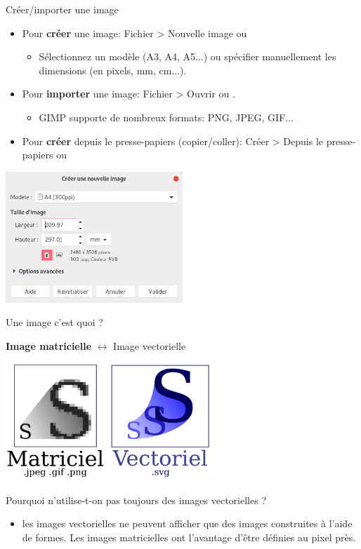 \documentclass[10pt,svgnames,usenames,table]{beamer}
\begin{document}
\begin{frame}{Créer/importer une image}
	\begin{itemize}
		\item Pour \textbf{créer} une image: Fichier > Nouvelle image ou 
			\begin{itemize}
				\item Sélectionnez un modèle (A3, A4, A5...) ou spécifier manuellement les dimensions (en pixels, mm, cm...).
			\end{itemize}
		\item Pour \textbf{importer} une image: Fichier  > Ouvrir ou .
			\begin{itemize}
				\item GIMP supporte de nombreux formats: PNG, JPEG, GIF...
			\end{itemize}
		\item Pour \textbf{créer} depuis le presse-papiers (copier/coller): Créer > Depuis le presse-papiers ou 
	\end{itemize}
	\begin{center}
		\includegraphics[width=0.5\textwidth]{Images/new_image.png}
	\end{center}
\end{frame}

\begin{frame}{Une image c'est quoi ?}
	\begin{center} 
		\textbf{Image matricielle} $\leftrightarrow$ Image vectorielle 
		\includegraphics[width=0.6\textwidth]{Images/mat_vs_vec}
	\end{center}
	Pourquoi n'utilise-t-on pas toujours des images vectorielles ? 
	\begin{itemize}
		\item les images vectorielles ne peuvent afficher que des images construites à l'aide de formes. Les images matricielles ont l'avantage d'être définies au pixel près.
	\end{itemize}
\end{frame}
\end{document}
